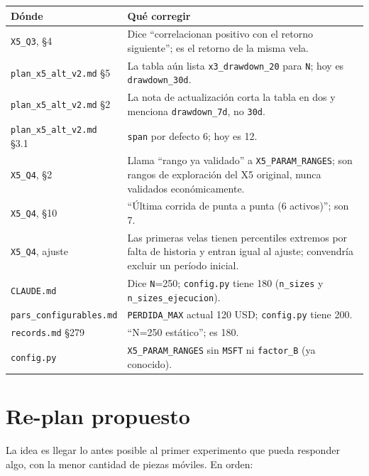 \documentclass[11pt,a4paper]{article}
\newcommand{\code}[1]{\texttt{\small #1}}
\begin{document}
\begin{small}
\noindent\begin{tabularx}{\linewidth}{@{}lX@{}}
\toprule
Dónde & Qué corregir \\
\midrule
\code{X5\_Q3}, §4 & Dice ``correlacionan positivo con el retorno siguiente''; es el retorno de la misma vela. \\
\code{plan\_x5\_alt\_v2.md} §5 & La tabla aún lista \code{x3\_drawdown\_20} para \code{N}; hoy es \code{drawdown\_30d}. \\
\code{plan\_x5\_alt\_v2.md} §2 & La nota de actualización corta la tabla en dos y menciona \code{drawdown\_7d}, no \code{30d}. \\
\code{plan\_x5\_alt\_v2.md} §3.1 & \code{span} por defecto 6; hoy es 12. \\
\code{X5\_Q4}, §2 & Llama ``rango ya validado'' a \code{X5\_PARAM\_RANGES}; son rangos de exploración del X5 original, nunca validados económicamente. \\
\code{X5\_Q4}, §10 & ``Última corrida de punta a punta (6 activos)''; son 7. \\
\code{X5\_Q4}, ajuste & Las primeras velas tienen percentiles extremos por falta de historia y entran igual al ajuste; convendría excluir un período inicial. \\
\code{CLAUDE.md} & Dice \code{N}=250; \code{config.py} tiene 180 (\code{n\_sizes} y \code{n\_sizes\_ejecucion}). \\
\code{pars\_configurables.md} & \code{PERDIDA\_MAX} actual 120 USD; \code{config.py} tiene 200. \\
\code{records.md} §279 & ``N=250 estático''; es 180. \\
\code{config.py} & \code{X5\_PARAM\_RANGES} sin \code{MSFT} ni \code{factor\_B} (ya conocido). \\
\bottomrule
\end{tabularx}
\end{small}

\section{Re-plan propuesto}\label{sec:plan}

La idea es llegar lo antes posible al primer experimento que pueda responder algo, con la menor
cantidad de piezas móviles. En orden:
\end{document}
